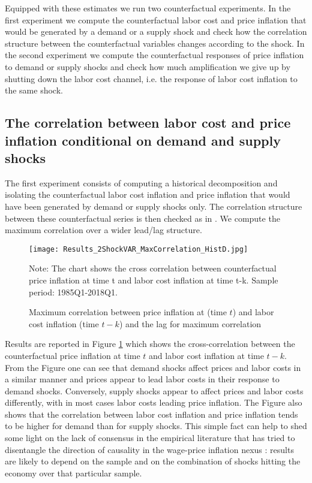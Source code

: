 \documentclass[11pt]{article}
\begin{document}
Equipped with these estimates we run two counterfactual experiments. In the first experiment we compute the counterfactual labor cost and price inflation that would be generated by a demand or a supply shock and check how the correlation structure between the counterfactual variables changes according to the shock. In the second experiment we compute the counterfactual responses of price inflation to demand or supply shocks and check how much amplification we give up by shutting down the labor cost channel, i.e. the response of labor cost inflation to the same shock.    

\subsection{The correlation between labor cost and price inflation conditional on demand and supply shocks}
The first experiment consists of computing a historical decomposition and isolating the counterfactual labor cost inflation and price inflation that would have been generated by demand or supply shocks only. The correlation structure between these counterfactual series is then checked as in \cite{Gali_99}. We compute the maximum correlation over a wider lead/lag structure. 
\begin{figure}
\begin{center}
\caption{Maximum correlation between price inflation at (time $t$) and labor cost inflation (time $t-k$) and the lag for maximum correlation}\label{fig:2ShockVAR_Correlation}
\texttt{[image: Results\_2ShockVAR\_MaxCorrelation\_HistD.jpg]}
\begin{minipage}{\textwidth} {\footnotesize
Note: The chart shows the cross correlation between counterfactual price inflation at time t and labor cost inflation at time t-k.
Sample period: 1985Q1-2018Q1.\par}
\end{minipage}
\end{center}
\end{figure}
Results are reported in Figure \ref{fig:2ShockVAR_Correlation} which shows the cross-correlation between the counterfactual price inflation at time $t$ and labor cost inflation at time $t-k$. From the Figure one can see that demand shocks affect prices and labor costs in a similar manner and prices appear to lead labor costs in their response to demand shocks. Conversely, supply shocks appear to affect prices and labor costs differently, with in most cases labor costs leading price inflation. The Figure also shows that the correlation between labor cost inflation and price inflation tends to be higher for demand than for supply shocks. This simple fact can help to shed some light on the lack of consensus in the empirical literature that  has tried to disentangle the direction of causality in the wage-price inflation nexus \citep{Knotek_Zaman_2014}: results are likely to depend on the sample and on the combination of shocks hitting the economy over that particular sample. 
\end{document}
